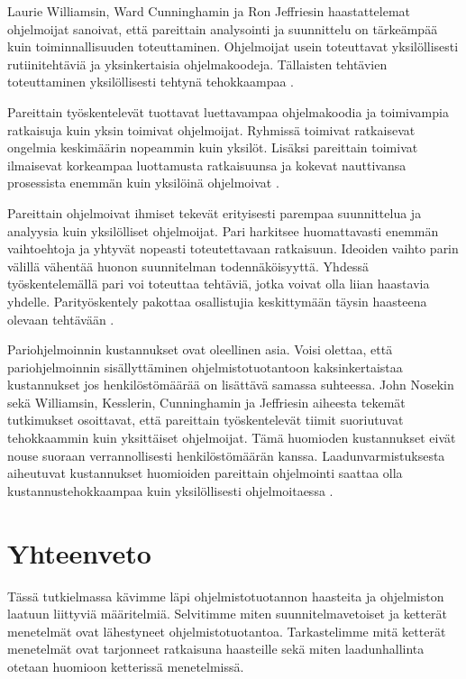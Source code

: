 \documentclass[finnish]{tktltiki2}
\theoremstyle{definition}
\theoremstyle{remark}
\begin{document}
Laurie Williamsin, Ward Cunninghamin ja Ron Jeffriesin haastattelemat ohjelmoijat sanoivat, että pareittain analysointi ja suunnittelu on tärkeämpää kuin toiminnallisuuden toteuttaminen. Ohjelmoijat usein toteuttavat yksilöllisesti rutiinitehtäviä ja yksinkertaisia ohjelmakoodeja. Tällaisten tehtävien toteuttaminen yksilöllisesti tehtynä tehokkaampaa \cite{WIL00}.

Pareittain työskentelevät tuottavat luettavampaa ohjelmakoodia ja toimivampia ratkaisuja kuin yksin toimivat ohjelmoijat. Ryhmissä toimivat ratkaisevat ongelmia keskimäärin nopeammin kuin yksilöt. Lisäksi pareittain toimivat ilmaisevat korkeampaa luottamusta ratkaisuunsa ja kokevat nauttivansa prosessista enemmän kuin yksilöinä ohjelmoivat \cite{NOS98}.

Pareittain ohjelmoivat ihmiset tekevät erityisesti parempaa suunnittelua ja analyysia kuin yksilölliset ohjelmoijat. Pari harkitsee huomattavasti enemmän vaihtoehtoja ja yhtyvät nopeasti toteutettavaan ratkaisuun. Ideoiden vaihto parin välillä vähentää huonon suunnitelman todennäköisyyttä. Yhdessä työskentelemällä pari voi toteuttaa tehtäviä, jotka voivat olla liian haastavia yhdelle. Parityöskentely pakottaa osallistujia keskittymään täysin haasteena olevaan tehtävään \cite{WIL00}.

Pariohjelmoinnin kustannukset ovat oleellinen asia. Voisi olettaa, että pariohjelmoinnin sisällyttäminen ohjelmistotuotantoon kaksinkertaistaa kustannukset jos henkilöstömäärää on lisättävä samassa suhteessa. John Nosekin \cite{NOS98} sekä Williamsin, Kesslerin, Cunninghamin ja Jeffriesin \cite{WIL00} aiheesta tekemät tutkimukset osoittavat, että pareittain työskentelevät tiimit suoriutuvat tehokkaammin kuin yksittäiset ohjelmoijat. Tämä huomioden kustannukset eivät nouse suoraan verrannollisesti henkilöstömäärän kanssa. Laadunvarmistuksesta aiheutuvat kustannukset huomioiden pareittain ohjelmointi saattaa olla kustannustehokkaampaa kuin yksilöllisesti ohjelmoitaessa \cite{COC00a}.

\section{Yhteenveto}

Tässä tutkielmassa kävimme läpi ohjelmistotuotannon haasteita ja ohjelmiston laatuun liittyviä määritelmiä. Selvitimme miten suunnitelmavetoiset ja ketterät menetelmät ovat lähestyneet ohjelmistotuotantoa. Tarkastelimme mitä ketterät menetelmät ovat tarjonneet ratkaisuna haasteille sekä miten laadunhallinta otetaan huomioon ketterissä menetelmissä. 
\end{document}

